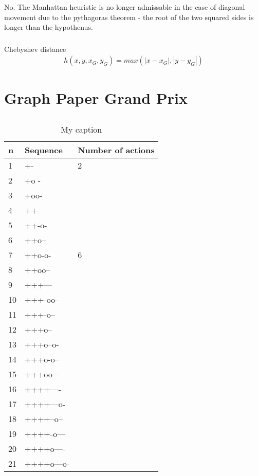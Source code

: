 \documentclass[12pt]{article}
\begin{document}
\subsubsection{}
No. The Manhattan heuristic is no longer admissable in the case of diagonal movement due to the pythagoras theorem - the root of the two squared sides is longer than the hypothenus.
\subsubsection{}
Chebyshev distance
\begin{gather*}
  h(x,y,x_G,y_G)= max(|x-x_G|, |y-y_G|)
\end{gather*}

\section{Graph Paper Grand Prix}

\subsection{}
\begin{table}[]
\centering
\caption{My caption}
\label{my-label}
\begin{tabular}{|l|l|l|}
\hline
n  & Sequence & Number of actions \\ \hline
1  &  +-      & 2                 \\ \hline
2  &  +o -    &                   \\ \hline
3  &  +oo-    &                   \\ \hline
4  &  ++--    &                   \\ \hline
5  &  ++-o-   &                   \\ \hline
6  &  ++o--   &                   \\ \hline
7  &  ++o-o-  & 6         \\ \hline
8  &  ++oo--  &                   \\ \hline
9  &  +++---  &                   \\ \hline
10 &  +++-oo- &                   \\ \hline
11 &  +++-o-- &                   \\ \hline
12 &  +++o--  &                   \\ \hline
13 &  +++o--o-  &                   \\ \hline
14 &  +++o-o--  &                   \\ \hline
15 &  +++oo---  &                   \\ \hline
16 &  ++++----  &                   \\ \hline
17 &  ++++---o-         &                   \\ \hline
18 &  ++++--o--        &                   \\ \hline
19 &  ++++-o---         &                   \\ \hline
20 &  ++++o----         &                   \\ \hline
21 &  ++++o---o-        &                   \\ \hline
\end{tabular}
\end{table}
\end{document}
